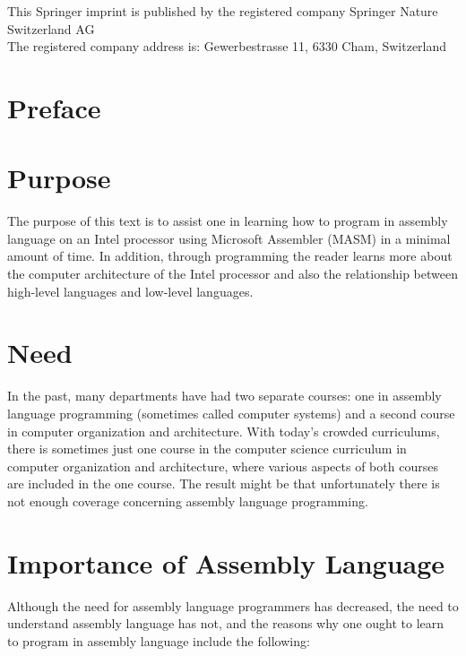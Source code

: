 \documentclass[10pt]{article}
\begin{document}
This Springer imprint is published by the registered company Springer Nature Switzerland AG\\
The registered company address is: Gewerbestrasse 11, 6330 Cham, Switzerland

\section*{Preface}
\section*{Purpose}
The purpose of this text is to assist one in learning how to program in assembly language on an Intel processor using Microsoft Assembler (MASM) in a minimal amount of time. In addition, through programming the reader learns more about the computer architecture of the Intel processor and also the relationship between high-level languages and low-level languages.

\section*{Need}
In the past, many departments have had two separate courses: one in assembly language programming (sometimes called computer systems) and a second course in computer organization and architecture. With today's crowded curriculums, there is sometimes just one course in the computer science curriculum in computer organization and architecture, where various aspects of both courses are included in the one course. The result might be that unfortunately there is not enough coverage concerning assembly language programming.

\section*{Importance of Assembly Language}
Although the need for assembly language programmers has decreased, the need to understand assembly language has not, and the reasons why one ought to learn to program in assembly language include the following:
\end{document}
